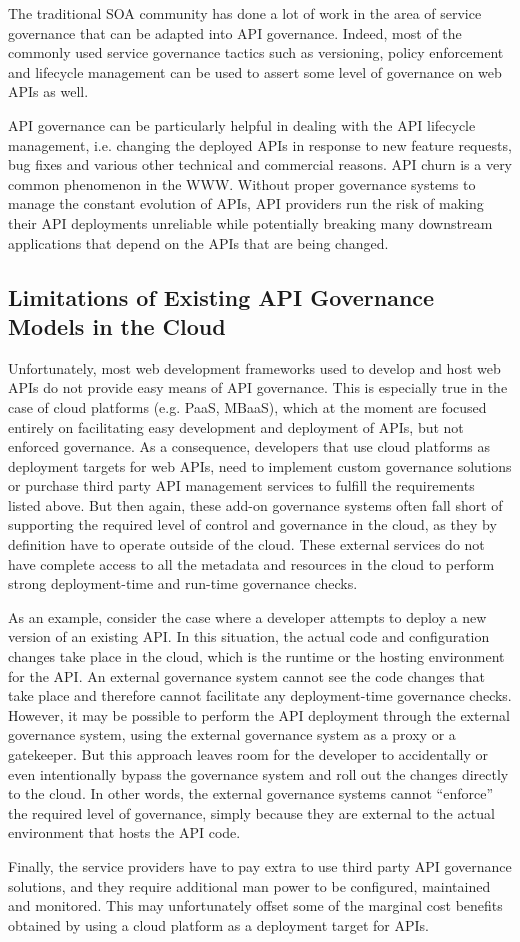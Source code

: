 The traditional SOA community has done a lot of work in the area of service governance that can be adapted into
API governance. Indeed, most of the commonly used service governance tactics such as versioning, policy enforcement and lifecycle
management can be used to assert some level of governance on web APIs as well.

API governance can be particularly helpful in dealing with the API lifecycle management, i.e. changing the deployed APIs in response to new
feature requests, bug fixes and various other technical and commercial reasons. API churn is a very common phenomenon in the WWW. Without
proper governance systems to manage the constant evolution of APIs, API providers run the risk of making their API deployments unreliable
while potentially breaking many downstream applications that depend on the APIs that are being changed.

\subsection{Limitations of Existing API Governance Models in the Cloud}
Unfortunately, most web development frameworks used to develop and host web APIs do not provide easy means of API governance. This is
especially true in the case of cloud platforms (e.g. PaaS, MBaaS), which at the moment are focused entirely on facilitating easy development
and deployment of APIs, but not enforced governance. As a consequence, developers that use cloud platforms as deployment targets for web APIs, 
need to implement custom governance solutions or purchase third party API management services to fulfill the requirements listed above. But 
then again, these add-on governance
systems often fall short of supporting the required level of control and governance in the cloud, as they by definition have to operate outside of the
cloud. These external services do not have complete access to all the metadata and resources in the cloud to perform strong deployment-time and
run-time governance checks. 

As an example, consider the case where a developer attempts to deploy a new version of an existing API. In this
situation, the actual code and configuration changes take place in the cloud, which is the runtime or the hosting environment for the API. An 
external governance system cannot see the code changes that take place and therefore cannot facilitate any deployment-time governance checks.
However, it may be possible to perform the API deployment through the external governance system, using the external governance system
as a proxy or a gatekeeper. But this approach leaves room for the developer to accidentally
or even intentionally bypass the governance system and roll out the changes directly to the cloud. In other words, the external governance systems
cannot ``enforce'' the required level of governance, simply because they are external to the actual environment that hosts the API code.

Finally, the service providers have to pay extra to use third party API governance solutions, and they require
additional man power to be configured, maintained and monitored. This may unfortunately offset some of the marginal cost benefits obtained
by using a cloud platform as a deployment target for APIs.